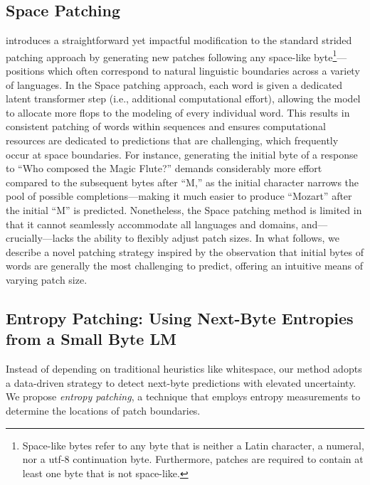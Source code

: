 \subsection{Space Patching}
\label{section:white-patch}

\citet{slagle2024spacebyte} introduces a straightforward yet impactful modification to the standard strided patching approach by generating new patches following any space-like byte\footnote{
    Space-like bytes refer to any byte that is neither a Latin character, a numeral, nor a utf-8 continuation byte. Furthermore, patches are required to contain at least one byte that is not space-like. }—positions which often correspond to natural linguistic boundaries across a variety of languages. In the Space patching approach, each word is given a dedicated latent transformer step (i.e., additional computational effort), allowing the model to allocate more flops to the modeling of every individual word. This results in consistent patching of words within sequences and ensures computational resources are dedicated to predictions that are challenging, which frequently occur at space boundaries. For instance, generating the initial byte of a response to ``Who composed the Magic Flute?\uline{\hspace{.6em}}'' demands considerably more effort compared to the subsequent bytes after ``M,'' as the initial character narrows the pool of possible completions—making it much easier to produce ``Mozart'' after the initial ``M'' is predicted. Nonetheless, the Space patching method is limited in that it cannot seamlessly accommodate all languages and domains, and—crucially—lacks the ability to flexibly adjust patch sizes. In what follows, we describe a novel patching strategy inspired by the observation that initial bytes of words are generally the most challenging to predict, offering an intuitive means of varying patch size.

\subsection{Entropy Patching: Using Next-Byte Entropies from a Small Byte LM}
\label{section:dyn-patch}

Instead of depending on traditional heuristics like whitespace, our method adopts a data-driven strategy to detect next-byte predictions with elevated uncertainty. We propose \textit{entropy patching}, a technique that employs entropy measurements to determine the locations of patch boundaries.

